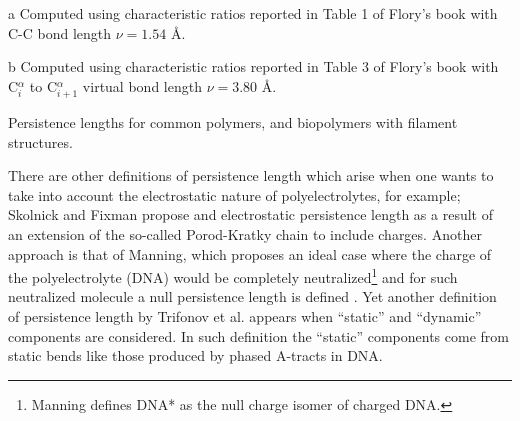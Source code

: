 \begin{table}[htbp]
\begin{center}
\begin{threeparttable}
\begin{tablenotes}
\item [a] Computed using  characteristic ratios reported in Table 1
  of Flory's book \cite{flory1969} with C-C bond length $\nu = 1.54$ \AA.
\item [b] Computed using  characteristic ratios reported in Table 3
  of Flory's book \cite{flory1969} with C$^{\alpha}_{i}$ to C$^{\alpha}_{i+1}$ virtual
  bond length $\nu = 3.80$ \AA.
\end{tablenotes}
\end{threeparttable}
\caption{Persistence lengths for common polymers, and biopolymers with
  filament structures.}
\label{tab:perval}
\end{center}
\end{table}


There are other definitions of persistence length which arise when one
wants   to   take   into   account   the   electrostatic   nature   of
polyelectrolytes, for example; Skolnick and Fixman \cite{skolnick1977}
propose  and  electrostatic  persistence  length  as a  result  of  an
extension  of the  so-called  Porod-Kratky chain  to include  charges.
Another  approach is  that of  Manning, which  proposes an  ideal case
where  the charge  of the  polyelectrolyte (DNA)  would  be completely
neutralized\footnote{Manning defines DNA* as the null charge isomer of
  charged DNA.}  and for  such neutralized molecule a null persistence
length  is  defined  \cite{manning2006}.   Yet another  definition  of
persistence length by Trifonov et al. \cite{trifonov1987} appears when
``static''  and  ``dynamic''   components  are  considered.   In  such
definition the ``static'' components come from static bends like those
produced by phased A-tracts in DNA.

